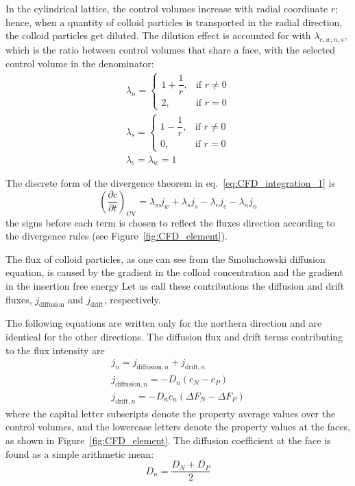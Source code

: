 \documentclass[10pt, a4paper]{article}
\begin{document}
\begin{multicols}{2}
In the cylindrical lattice, the control volumes increase with radial coordinate $r$; hence, when a quantity of colloid particles is transported in the radial direction, the colloid particles get diluted.
The dilution effect is accounted for with $\lambda_{e,w,n,s}$, which is the ratio between control volumes that share a face, with the selected control volume in the denominator:
\begin{eqnarray}
    \lambda_n =\begin{cases}
        1 + \dfrac{1}{r}, & \text{if } r \ne 0\\
        2, & \text{if } r = 0
    \end{cases}
    \\
    \lambda_s =\begin{cases}
        1 - \dfrac{1}{r}, & \text{if } r \ne 0\\
        0, & \text{if } r = 0
    \end{cases}
    \\
    \lambda_{e} = \lambda_{w} = 1
\end{eqnarray}

The discrete form of the divergence theorem in eq.~\ref{eq:CFD_integration_1} is
\begin{equation}
    \label{eq:CFD_integration_2}
    \left( \frac{\partial c}{\partial t} \right)_{\text{CV}} = \lambda_w j_w + \lambda_s j_s - \lambda_e j_e - \lambda_n j_n
\end{equation}
the signs before each term is chosen to reflect the fluxes direction according to the divergence rules (see Figure~\ref{fig:CFD_element}).

The flux of colloid particles, as one can see from the Smoluchowski diffusion equation, is caused by the gradient in the colloid concentration and the gradient in the insertion free energy
Let us call these contributions the diffusion and drift fluxes, $j_{\text{diffusion}}$ and $j_{\text{drift}}$, respectively.

The following equations are written only for the northern direction and are identical for the other directions.
The diffusion flux and drift terms contributing to the flux intensity are
\begin{eqnarray}
    j_n = j_{\text{diffusion}, n} + j_{\text{drift}, n} \\
    j_{\text{diffusion}, n} = - D_n (c_N - c_P) \\
    j_{\text{drift}, n} = - D_n c_n (\Delta F_N - \Delta F_P)
\end{eqnarray}
where the capital letter subscripts denote the property average values over the control volumes, and the lowercase letters denote the property values at the faces, as shown in Figure~\ref{fig:CFD_element}.
The diffusion coefficient at the face is found as a simple arithmetic mean:
\begin{equation}
    D_n = \frac{D_N + D_P}{2}
\end{equation}


\end{multicols}
\end{document}
